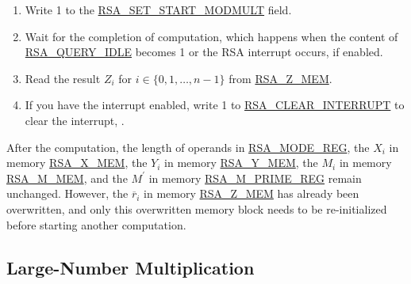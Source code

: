 \documentclass[main\_\_EN.tex]{subfiles}
\begin{document}
\begin{enumerate}
        Users need to write data to each memory block only according to the length of the number; data beyond this length are ignored.

    \item Write 1 to the \hyperref[fielddesc:RSASETSTARTMODMULT]{RSA\_SET\_START\_MODMULT} field.

    \item Wait for the completion of computation, which happens when the content of \hyperref[fielddesc:RSAQUERYIDLE]{RSA\_QUERY\_IDLE} becomes 1 or the RSA interrupt occurs, if enabled.

    \item Read the result \begin{math}Z_{i}\end{math} for \begin{math}i \in \{ 0, 1, \dots, n-1 \} \end{math} from \hyperref[regdesc:RSAmemory]{RSA\_Z\_MEM}.
    \item If you have the interrupt enabled, write 1 to \hyperref[fielddesc:RSACLEARINTERRUPT]{RSA\_CLEAR\_INTERRUPT} to clear the interrupt, .

\end{enumerate}

After the computation, the length of operands in \hyperref[regdesc:RSAMODEREG]{RSA\_MODE\_REG}, the \begin{math}X_{i}\end{math} in memory \hyperref[regdesc:RSAmemory]{RSA\_X\_MEM}, the \begin{math}Y_{i}\end{math} in memory \hyperref[regdesc:RSAmemory]{RSA\_Y\_MEM}, the \begin{math}M_{i}\end{math} in memory \hyperref[regdesc:RSAmemory]{RSA\_M\_MEM}, and the \begin{math}M^{\prime}\end{math} in memory \hyperref[regdesc:RSAMPRIMEREG]{RSA\_M\_PRIME\_REG} remain unchanged. However, the \begin{math}\overline{r}_{i}\end{math} in memory \hyperref[regdesc:RSAmemory]{RSA\_Z\_MEM} has already been overwritten, and only this overwritten memory block needs to be re-initialized before starting another computation.

\subsection{Large-Number Multiplication}
\end{document}
